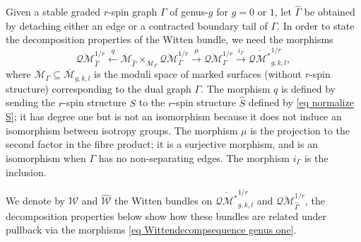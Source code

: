 \documentclass[11pt,a4paper]{article}
\theoremstyle{definition}
\theoremstyle{remark}
\newcommand{\oQMb}{{\overline{\mathcal{QM}}}}
\numberwithin{equation}{section}
\def\Mbar{{\overline{\mathcal M}}}
\begin{document}
Given a stable graded $r$-spin graph $\Gamma$ of genus-$g$ for $g=0$ or $1$, let $\widehat{\Gamma}$ be obtained by detaching either an edge or a contracted boundary tail of $\Gamma$.  In order to state the decomposition properties of the Witten bundle, we need the morphisms
\begin{equation}
\label{eq Wittendecompsequence genus one}
\oQMb_{\widehat{\Gamma}}^{1/r} \xleftarrow{q} \Mbar_{\widehat{\Gamma}} \times_{\Mbar_{\Gamma}} \oQMb_{\Gamma}^{1/r} \xrightarrow{\mu} \oQMb_{\Gamma}^{1/r} \xrightarrow{i_{\Gamma}} \overline{\mathcal{QM}^*}_{g,k,l}^{1/r},
\end{equation}
where $\Mbar_{\Gamma} \subseteq \Mbar_{g,k,l}$ is the moduli space of marked surfaces (without $r$-spin structure) corresponding to the dual graph $\Gamma$.  The morphism $q$ is defined by sending the $r$-spin structure $S$ to the $r$-spin structure $\widehat{S}$ defined by \eqref{eq normalize S}; it has degree one but is not an isomorphism because it does not induce an isomorphism between isotropy groups.  The morphism $\mu$ is the projection to the second factor in the fibre product; it is a surjective morphism, and is an isomorphism when $\Gamma$ has no non-separating edges.  The morphism $i_{\Gamma}$ is the inclusion.

We denote by ${\mathcal{W}}$ and $\widehat{{\mathcal{W}}}$ the Witten bundles on $\overline{\mathcal{QM}^*}_{g,k,l}^{1/r}$ and $\oQMb_{\widehat{\Gamma}}^{1/r}$, the decomposition properties below show how these bundles are related under pullback via the morphisms \eqref{eq Wittendecompsequence genus one}.  
\end{document}

